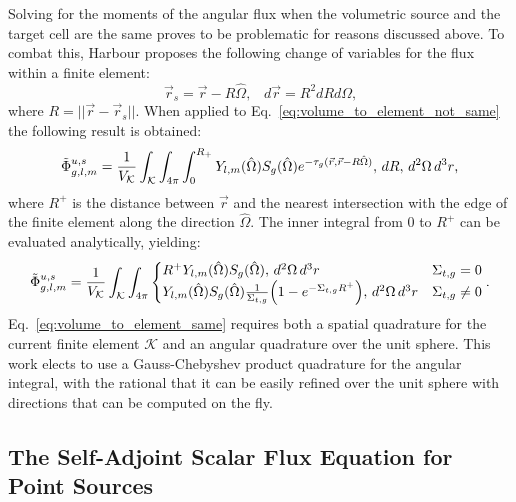 Solving for the moments of the angular flux when the volumetric source and the target cell are the same proves to be problematic for reasons discussed above. To combat this, Harbour \cite{harbour_uncollided} proposes the following change of variables for the flux within a finite element:
\begin{equation*}
    \vec{r}_{s} = \vec{r} - R\hat{\Omega},\,\,\,\,\, d\vec{r} = R^{2}dRd\Omega\text{,}
\end{equation*}
where $R = ||\vec{r} - \vec{r}_{s}||$. When applied to Eq.~\ref{eq:volume_to_element_not_same} the following result is obtained:
\begin{equation*}
    \Tilde{\Phi}_{g,l,m}^{u, s} = \frac{1}{V_{\mathcal{K}}}\int_{\mathcal{K}} \int_{4\pi}\int_{0}^{R_{+}} Y_{l,m}(\hat{\Omega})S_{g}(\hat{\Omega})e^{-\tau_{g}(\vec{r}, \vec{r} - R\hat{\Omega})},\,dR,\,d^{2}\Omega\,d^{3}r\text{,}
\end{equation*}
where $R^{+}$ is the distance between $\vec{r}$ and the nearest intersection with the edge of the finite element along the direction $\hat{\Omega}$. The inner integral from $0$ to $R^{+}$ can be evaluated analytically, yielding:
\begin{equation}\label{eq:volume_to_element_same}
    \Tilde{\Phi}_{g,l,m}^{u, s} = \frac{1}{V_{\mathcal{K}}}\int_{\mathcal{K}} \int_{4\pi}
    \begin{cases}
        R^{+}Y_{l,m}(\hat{\Omega})S_{g}(\hat{\Omega}),\,d^{2}\Omega\,d^{3}r & \Sigma_{t,g} = 0 \\
        Y_{l,m}(\hat{\Omega})S_{g}(\hat{\Omega})\frac{1}{\Sigma_{t,g}}\Big(1 - e^{-\Sigma_{t,g}R^{+}}\Big),\,d^{2}\Omega\,d^{3}r & \Sigma_{t,g} \neq 0
    \end{cases}
    \text{.}
\end{equation}
Eq.~\ref{eq:volume_to_element_same} requires both a spatial quadrature for the current finite element $\mathcal{K}$ and an angular quadrature over the unit sphere. This work elects to use a Gauss-Chebyshev product quadrature for the angular integral, with the rational that it can be easily refined over the unit sphere with directions that can be computed on the fly. 

\subsection{The Self-Adjoint Scalar Flux Equation for Point Sources}
\label{solver:radiation_transport:sasf_point_source}


